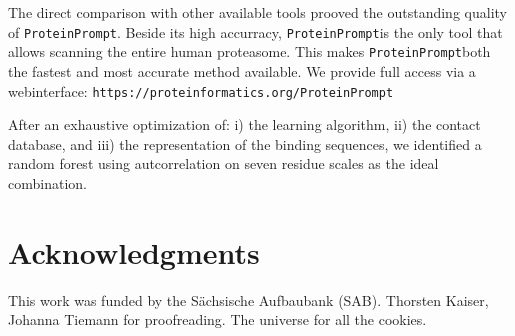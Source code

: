 \documentclass[preprint,3p,times,twocolumn]{elsarticle}
\newcommand{\url}[1]{\texttt{https://\small #1}}
\newcommand{\tool}{\texttt{ProteinPrompt}\hspace{2pt}}
\newcommand{\website}{\url{proteinformatics.org/\tool}}
\begin{document}
The direct comparison with other available tools prooved the outstanding quality of \tool.
Beside its high accurracy, \tool is the only tool that allows scanning the entire human proteasome.
This makes \tool both the fastest and most accurate method available.
We provide full access via a webinterface:
\website

After an exhaustive optimization of: i) the learning algorithm, ii) the contact database, and iii) the representation of the binding sequences, we identified a random forest using autcorrelation on seven residue scales as the ideal combination. 



\section*{Acknowledgments}

This work was funded by the S\"achsische Aufbaubank (SAB).
Thorsten Kaiser, Johanna Tiemann for proofreading.
The universe for all the cookies.




\end{document}
